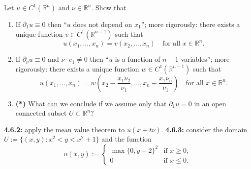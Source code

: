 \begin{exercise}
\label{ex:directional_derivative_vanishes}
Let $u \in C^1(\mathbb{R}^n)$ and $\nu \in \mathbb{R}^n$. Show that
\begin{enumerate}[label=\textbf{(\alph*)}]
  \item If $\partial_1 u \equiv 0$ then ``$u$ does not depend on $x_1$''; more rigorously: there
    exists a unique function $v \in C^1(\mathbb{R}^{n-1})$ such that
    \begin{equation*}
    u(x_1,\dots,x_n) = v(x_2,\dots,x_n) \quad \text{for all } x \in \mathbb{R}^n. \tag{2}
    \end{equation*}
  \item If $\partial_\nu u \equiv 0$ and $\nu\cdot e_1 \neq 0$ then ``$u$ is a function of $n-1$
    variables''; more rigorously: there exists a unique function $w \in C^1(\mathbb{R}^{n-1})$
    such that
    \[u(x_1,\dots,x_n) = w\!\left(x_2 - \frac{x_1\nu_2}{\nu_1}, \dots, x_n - \frac{x_1\nu_n}{\nu_1}\right) \quad \text{for all } x \in \mathbb{R}^n.\]
  \item \textbf{(*)} What can we conclude if we assume only that $\partial_1 u = 0$ in an open
    connected subset $U \subset \mathbb{R}^n$?
\end{enumerate}
\begin{exercisehint}
\textbf{4.6.2:} apply the mean value theorem to $u(x + t\nu)$.
\textbf{4.6.3:} consider the domain $U := \{(x,y) : x^2 < y < x^2+1\}$ and the function
\[u(x,y) := \begin{cases} \max\{0, y-2\}^2 & \text{if } x \geq 0, \\ 0 & \text{if } x \leq 0.\end{cases}\]
\end{exercisehint}
\end{exercise}


